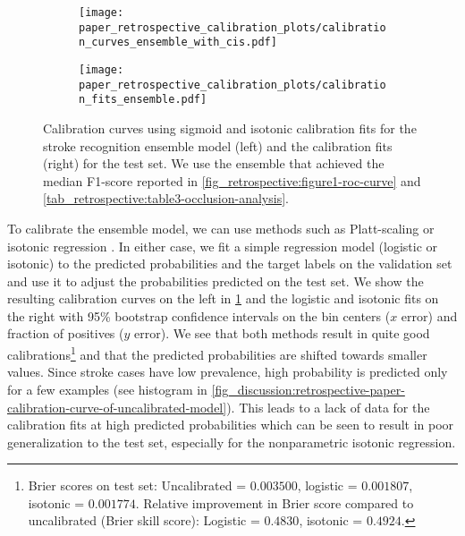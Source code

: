 \begin{figure}[t!]
    \centering
    \begin{subfigure}[c]{0.49\columnwidth}
        \centering
        \texttt{[image: paper\_retrospective\_calibration\_plots/calibration\_curves\_ensemble\_with\_cis.pdf]}
    \end{subfigure}
    \hfill
    \begin{subfigure}[c]{0.49\columnwidth}
        \centering
        \texttt{[image: paper\_retrospective\_calibration\_plots/calibration\_fits\_ensemble.pdf]}
    \end{subfigure}    
    \caption[Calibration fits and curves for the stroke recognition ensemble using Platt-scaling and isotonic regression for calibration.]{ Calibration curves using sigmoid and isotonic calibration fits for the stroke recognition ensemble model (left) and the calibration fits (right) for the test set. We use the ensemble that achieved the median F1-score reported in \cref{fig_retrospective:figure1-roc-curve} and \cref{tab_retrospective:table3-occlusion-analysis}.}
    \label{fig_discussion:retrospective-paper-calibration-curve-sigmoid-isotonic}
\end{figure}

To calibrate the ensemble model, we can use methods such as Platt-scaling \parencite{platt_probabilistic_1999} or isotonic regression \parencite{zadrozny_transforming_2002}. 
In either case, we fit a simple regression model (logistic or isotonic) to the predicted probabilities and the target labels on the validation set and use it to adjust the probabilities predicted on the test set. We show the resulting calibration curves on the left in \cref{fig_discussion:retrospective-paper-calibration-curve-sigmoid-isotonic} and the logistic and isotonic fits on the right with 95\% bootstrap confidence intervals on the bin centers ($x$ error) and fraction of positives ($y$ error). 
We see that both methods result in quite good calibrations\footnote{Brier scores on test set: Uncalibrated = $0.003500$, logistic = $0.001807$, isotonic = $0.001774$. Relative improvement in Brier score compared to uncalibrated (Brier skill score): Logistic = $0.4830$, isotonic = $0.4924$.} and that the predicted probabilities are shifted towards smaller values. 
Since stroke cases have low prevalence, high probability is predicted only for a few examples (see histogram in \cref{fig_discussion:retrospective-paper-calibration-curve-of-uncalibrated-model}). This leads to a lack of data for the calibration fits at high predicted probabilities which can be seen to result in poor generalization to the test set, especially for the nonparametric isotonic regression.

